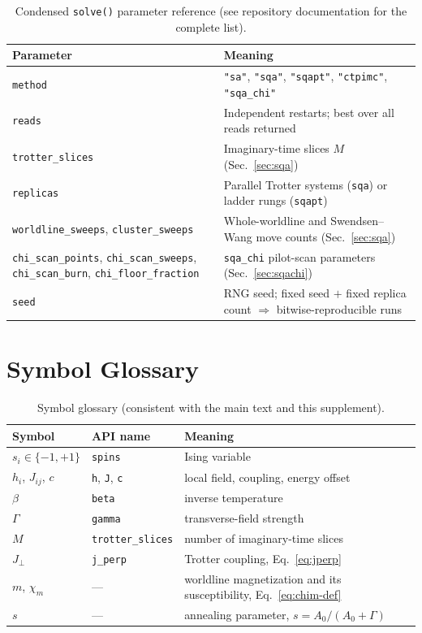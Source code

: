 \documentclass[11pt]{article}
\newcommand{\chim}{\chi_{m}}
\begin{document}
\begin{table}[h]
\centering
\small
\caption{Condensed \texttt{solve()} parameter reference (see repository documentation for the complete list).}
\label{tab:api}
\begin{tabular}{p{4.0cm}p{8.5cm}}
\toprule
Parameter & Meaning \\
\midrule
\texttt{method} & \texttt{"sa"}, \texttt{"sqa"}, \texttt{"sqapt"}, \texttt{"ctpimc"}, \texttt{"sqa\_chi"} \\
\texttt{reads} & Independent restarts; best over all reads returned \\
\texttt{trotter\_slices} & Imaginary-time slices $M$ (Sec.~\ref{sec:sqa}) \\
\texttt{replicas} & Parallel Trotter systems (\texttt{sqa}) or ladder rungs (\texttt{sqapt}) \\
\texttt{worldline\_sweeps}, \texttt{cluster\_sweeps} & Whole-worldline and Swendsen--Wang move counts (Sec.~\ref{sec:sqa}) \\
\texttt{chi\_scan\_points}, \texttt{chi\_scan\_sweeps}, \texttt{chi\_scan\_burn}, \texttt{chi\_floor\_fraction} & \texttt{sqa\_chi} pilot-scan parameters (Sec.~\ref{sec:sqachi}) \\
\texttt{seed} & RNG seed; fixed seed $+$ fixed replica count $\Rightarrow$ bitwise-reproducible runs \\
\bottomrule
\end{tabular}
\end{table}

\section{Symbol Glossary}
\label{sec:glossary}

\begin{table}[h]
\centering
\small
\caption{Symbol glossary (consistent with the main text and this supplement).}
\begin{tabular}{lll}
\toprule
Symbol & API name & Meaning \\
\midrule
$s_i\in\{-1,+1\}$ & \texttt{spins} & Ising variable \\
$h_i$, $J_{ij}$, $c$ & \texttt{h}, \texttt{J}, \texttt{c} & local field, coupling, energy offset \\
$\beta$ & \texttt{beta} & inverse temperature \\
$\Gamma$ & \texttt{gamma} & transverse-field strength \\
$M$ & \texttt{trotter\_slices} & number of imaginary-time slices \\
$J_\perp$ & \texttt{j\_perp} & Trotter coupling, Eq.~\eqref{eq:jperp} \\
$m$, $\chim$ & --- & worldline magnetization and its susceptibility, Eq.~\eqref{eq:chim-def} \\
$s$ & --- & annealing parameter, $s=A_0/(A_0+\Gamma)$ \\
\bottomrule
\end{tabular}
\end{table}
\end{document}
